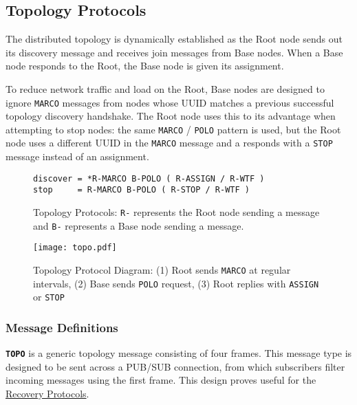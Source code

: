 \subsection{Topology Protocols}
\label{proto_topo}

The \dcamp distributed topology is dynamically established as the Root node sends out its discovery message and receives
join messages from Base nodes. When a Base node responds to the Root, the Base node is given its assignment.

To reduce network traffic and load on the Root, Base nodes are designed to ignore \texttt{MARCO} messages from nodes
whose UUID matches a previous successful topology discovery handshake. The Root node uses this to its advantage when
attempting to stop nodes: the same \texttt{MARCO} / \texttt{POLO} pattern is used, but the Root node uses a different
UUID in the \texttt{MARCO} message and a responds with a \texttt{STOP} message instead of an assignment.

\begin{figure}[H]
\vspace{+10pt}
\begin{verbatim}
discover = *R-MARCO B-POLO ( R-ASSIGN / R-WTF )
stop     = R-MARCO B-POLO ( R-STOP / R-WTF )
\end{verbatim}
\vspace{-5pt}
\caption[Topology Protocols]
        {Topology Protocols: \texttt{R-} represents the Root node sending a message and \texttt{B-}
         represents a Base node sending a message.}
\label{fig:proto_topo_spec}
\end{figure}

\begin{figure}[H]
    \centering
    \texttt{[image: topo.pdf]}
    \label{fig:proto_topo_image}
    \caption[Topology Protocol Diagram]
	    {Topology Protocol Diagram: (1) Root sends \texttt{MARCO} at regular intervals, (2) Base sends \texttt{POLO}
	     request, (3) Root replies with  \texttt{ASSIGN} or \texttt{STOP}}
\end{figure}

\subsubsection{Message Definitions}

\textbf{\texttt{TOPO}} is a generic topology message consisting of four frames. This message type is designed to be sent
across a PUB/SUB connection, from which subscribers filter incoming messages using the first frame. This design proves
useful for the \hyperref[proto_reco]{Recovery Protocols}.


